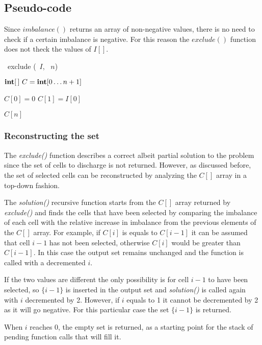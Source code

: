 \subsection{Pseudo-code}
Since $\mathit{imbalance()}$ returns an array of non-negative values, there is no need to check if a certain imbalance is negative. For this reason the $\mathit{exclude()}$ function does not theck the values of $I[]$.

\begin{algorithm}[H]
    \DontPrintSemicolon
    \NoCaptionOfAlgo
    \caption[exclude]{\INTEGER\ \textsf{exclude} (\INTARRAY\ $I$, \INTEGER\ $n$)}\label{algorithm:exclude}
    $\INTARRAY\ C = \INTEGER[0 \ldots n+1]$\;

    $C[0] = 0$\;
    $C[1] = I[0]$\;


    \Return $C[n]$\;
\end{algorithm}

\subsubsection{Reconstructing the set}
The \textit{exclude()} function describes a correct albeit partial solution to the problem since the set of cells to discharge is not returned. However, as discussed before, the set of selected cells can be reconstructed by analyzing the $C[]$ array in a top-down fashion.

The \textit{solution()} recursive function starts from the $C[]$ array returned by \textit{exclude()} and finds the cells that have been selected by comparing the imbalance of each cell with the relative increase in imbalance from the previous elements of the $C[]$ array.
For example, if $C[i]$ is equals to $C[i-1]$ it can be assumed that cell $i-1$ has not been selected, otherwise $C[i]$ would be greater than $C[i-1]$. In this case the output set remains unchanged and the function is called with a decremented $i$.

If the two values are different the only possibility is for cell $i-1$ to have been selected, so $\{i-1\}$ is inserted in the output set and \textit{solution()} is called again with $i$ decremented by 2. However, if $i$ equals to 1 it cannot be decremented by 2 as it will go negative. For this particular case the set $\{i-1\}$ is returned.

When $i$ reaches 0, the empty set is returned, as a starting point for the stack of pending function calls that will fill it.

